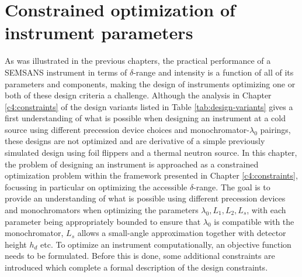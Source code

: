\chapter{Constrained optimization of instrument parameters}
\label{chapter:optimization}
\label{c5:optimization}
As was illustrated in the previous chapters, the practical performance of a SEMSANS instrument in terms of $\delta$-range and intensity is a function of all of its parameters and components, making the design of instruments optimizing one or both of these design criteria a challenge. Although the analysis in Chapter \ref{c4:constraints} of the design variants listed in Table \ref{tab:design-variants} gives a first understanding of what is possible when designing an instrument at a cold source using different precession device choices and monochromator-$\lambda_0$ pairings, these designs are not optimized and are derivative of a simple previously simulated design \cite{bouwman2021b} using foil flippers and a thermal neutron source. In this chapter, the problem of designing an instrument is approached as a constrained optimization problem within the framework presented in Chapter \ref{c4:constraints}, focussing in particular on optimizing the accessible $\delta$-range. The goal is to provide an understanding of what is possible using different precession devices and monochromators when optimizing the parameters $\lambda_0, L_1, L_2, L_s$, with each parameter being appropriately bounded to ensure that $\lambda_0$ is compatible with the monochromator, $L_s$ allows a small-angle approximation together with detector height $h_d$ etc. 
To optimize an instrument computationally, an objective function needs to be formulated. Before this is done, some additional constraints are introduced which complete a formal description of the design constraints.


